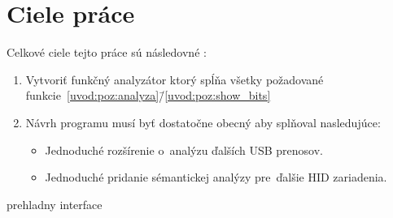 \section{Ciele práce}

Celkové ciele tejto práce sú následovné :

\begin{enumerate}[label=\textbf{C\arabic*}]
	\item \label{uvod:ciel:aplikacia} Vytvoriť funkčný analyzátor ktorý spĺňa všetky požadované funkcie~\ref{uvod:poz:analyza}\=/\ref{uvod:poz:show_bits}
	\item \label{uvod:ciel:rozsiritelnost} Návrh programu musí byť dostatočne obecný aby splňoval nasledujúce:
	\begin{itemize}
		\item \label{uvod:ciel:roz_USB} Jednoduché rozšírenie o~analýzu ďalších USB prenosov.
		\item \label{uvod:ciel:roz_HID} Jednoduché pridanie sémantickej analýzy pre~ďalšie HID zariadenia.
	\end{itemize}
\end{enumerate}

prehladny interface